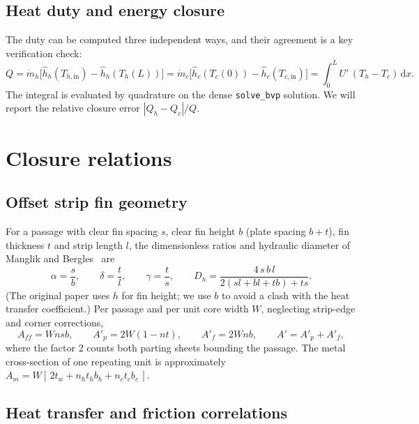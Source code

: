 \documentclass[11pt]{article}
\newcommand{\dd}{\mathrm{d}}
\newcommand{\hin}{_{h,\mathrm{in}}}
\newcommand{\cin}{_{c,\mathrm{in}}}
\begin{document}
\subsection{Heat duty and energy closure}

The duty can be computed three independent ways, and their agreement is a key verification check:
\begin{equation}
  Q = \dot m_h\big[\hat h_h(T\hin) - \hat h_h(T_h(L))\big]
    = \dot m_c\big[\hat h_c(T_c(0)) - \hat h_c(T\cin)\big]
    = \int_0^L U'\,(T_h - T_c)\,\dd x .
  \label{eq:Q}
\end{equation}
The integral is evaluated by quadrature on the dense \texttt{solve\_bvp} solution. We will report the relative closure error $|Q_h - Q_c|/Q$.

\section{Closure relations}
\label{sec:closure}

\subsection{Offset strip fin geometry}

For a passage with clear fin spacing $s$, clear fin height $b$ (plate spacing $b+t$), fin thickness $t$ and strip length $l$, the dimensionless ratios and hydraulic diameter of Manglik and Bergles~\cite{manglik1995} are
\begin{equation}
  \alpha = \frac{s}{b}, \qquad \delta = \frac{t}{l}, \qquad \gamma = \frac{t}{s},
  \qquad
  D_h = \frac{4\, s\, b\, l}{2(s l + b l + t b) + t s}.
\end{equation}
(The original paper uses $h$ for fin height; we use $b$ to avoid a clash with the heat transfer coefficient.) Per passage and per unit core width $W$, neglecting strip-edge and corner corrections,
\begin{equation}
  A_{ff} = W n s b, \qquad
  A'_p = 2W(1 - n t), \qquad
  A'_f = 2 W n b, \qquad
  A' = A'_p + A'_f,
\end{equation}
where the factor 2 counts both parting sheets bounding the passage. The metal cross-section of one repeating unit is approximately $A_m = W\left[\,2t_w + n_h t_h b_h + n_c t_c b_c\,\right]$.

\subsection{Heat transfer and friction correlations}
\end{document}
